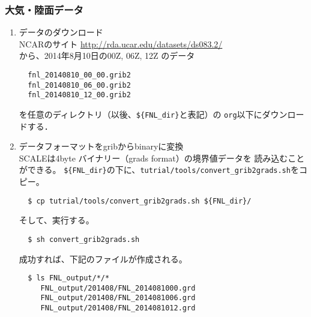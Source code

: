 \subsubsection{大気・陸面データ}
\begin{enumerate}
\item データのダウンロード\\
NCARのサイト
 \url{http://rda.ucar.edu/datasets/ds083.2/}\\
から、2014年8月10日の00Z, 06Z, 12Z のデータ
\begin{verbatim}
  fnl_20140810_00_00.grib2
  fnl_20140810_06_00.grib2
  fnl_20140810_12_00.grib2
\end{verbatim}
を任意のディレクトリ（以後、\verb|${FNL_dir}|と表記）の
\verb|org|以下にダウンロードする．

\item データフォーマットをgribからbinaryに変換\\
SCALEは4byte バイナリー（grads format）の境界値データを
読み込むことができる。
\verb|${FNL_dir}|の下に、\verb|tutrial/tools/convert_grib2grads.sh|をコピー。
\begin{verbatim}
  $ cp tutrial/tools/convert_grib2grads.sh ${FNL_dir}/
\end{verbatim}
そして、実行する。
\begin{verbatim}
  $ sh convert_grib2grads.sh
\end{verbatim}
成功すれば、下記のファイルが作成される。
\begin{verbatim}
  $ ls FNL_output/*/*
     FNL_output/201408/FNL_2014081000.grd
     FNL_output/201408/FNL_2014081006.grd
     FNL_output/201408/FNL_2014081012.grd
\end{verbatim}
\end{enumerate}

